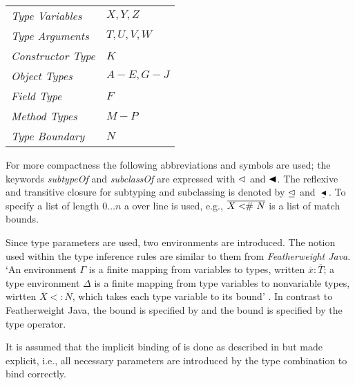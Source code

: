\begin{table}[H]
	\begin{tabular}{ll}
		\textit{Type Variables} & $X, Y, Z$ \\
		\textit{Type Arguments} & $T, U, V, W$ \\
		\textit{Constructor Type} & $K$ \\
		\textit{Object Types} & $A - E, G - J$ \\
		\textit{Field Type} & $F$ \\
		\textit{Method Types} & $M - P$ \\
		\textit{Type Boundary} & $N$
	\end{tabular}
\end{table}

For more compactness the following abbreviations and symbols are used; the
keywords \emph{subtypeOf} and \emph{subclassOf} are expressed with $\vartriangleleft$
and $\blacktriangleleft$. The reflexive and transitive closure for subtyping and
subclassing is denoted by $\trianglelefteq$ and $\underline{\blacktriangleleft}$.
To specify a list of length $0\ldots n$ a over line is used, e.g.,
$\overline{X <\!\!\#~ N}$ is a list of match bounds.

Since type parameters are used, two environments are introduced. The
notion used within the type inference rules are similar to them from
\emph{Featherweight Java}. `An environment $\Gamma$ is a finite
mapping from variables to types, written $\overline{x}:\overline{T}$;
a type environment $\Delta$ is a finite mapping from type variables to
nonvariable types, wirtten $\overline{X}<:\overline{N}$, which takes each
type variable to its bound' \cite{igarashi_featherweight_1999}. In contrast
to Featherweight Java, the bound is specified by \match and the bound is
specified by the type operator.

It is assumed that the implicit binding of \mytype is done as described
in  but made explicit, i.e., all necessary
parameters are introduced by the type combination to bind \mytype
correctly.

